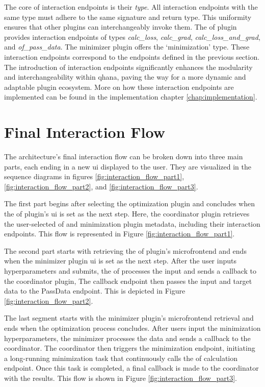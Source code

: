 \documentclass[
  a4paper,  %
  twoside,  %
  bibliography=totoc,
  headsepline,
  cleardoublepage=empty,
  parskip=half,
  draft=false
]{scrbook}
\begin{document}
The core of interaction endpoints is their \emph{type}.
All interaction endpoints with the same type must adhere to the same signature and return type.
This uniformity ensures that other plugins can interchangeably invoke them.
The \gls{of} plugin provides interaction endpoints of types \emph{calc\_loss}, \emph{calc\_grad}, \emph{calc\_loss\_and\_grad}, and \emph{of\_pass\_data}.
The minimizer plugin offers the `minimization' type.
These interaction endpoints correspond to the endpoints defined in the previous section.
The introduction of interaction endpoints significantly enhances the modularity and interchangeability within \gls{qhana}, paving the way for a more dynamic and adaptable plugin ecosystem.
More on how these interaction endpoints are implemented can be found in the implementation chapter \ref{chap:implementation}.

\section{Final Interaction Flow}
The architecture's final interaction flow can be broken down into three main parts, each ending in a new \gls{ui} displayed to the user.
They are visualized in the sequence diagrams in figures \ref{fig:interaction_flow_part1}, \ref{fig:interaction_flow_part2}, and \ref{fig:interaction_flow_part3}.

The first part begins after selecting the optimization plugin and concludes when the \gls{of} plugin's \gls{ui} is set as the next step.
Here, the coordinator plugin retrieves the user-selected \gls{of} and minimization plugin metadata, including their interaction endpoints.
This flow is represented in Figure \ref{fig:interaction_flow_part1}.

The second part starts with retrieving the \gls{of} plugin's microfrontend and ends when the minimizer plugin \gls{ui} is set as the next step.
After the user inputs hyperparameters and submits, the \gls{of} processes the input and sends a callback to the coordinator plugin,
The callback endpoint then passes the input and target data to the PassData endpoint.
This is depicted in Figure \ref{fig:interaction_flow_part2}.

The last segment starts with the minimizer plugin's microfrontend retrieval and ends when the optimization process concludes.
After users input the minimization hyperparameters, the minimizer processes the data and sends a callback to the coordinator.
The coordinator then triggers the minimization endpoint, initiating a long-running minimization task that continuously calls the \gls{of} calculation endpoint.
Once this task is completed, a final callback is made to the coordinator with the results.
This flow is shown in Figure \ref{fig:interaction_flow_part3}.
\end{document}

